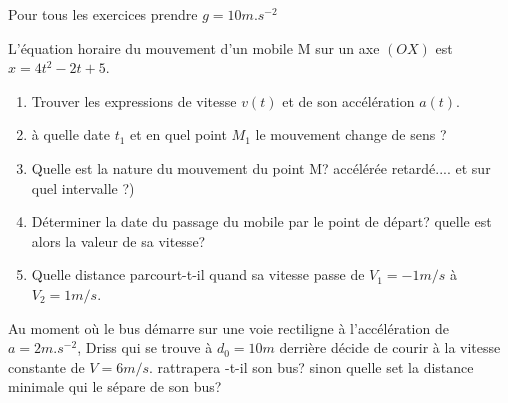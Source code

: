 \documentclass[10pt,a4paper]{article}
\begin{document}
 Pour tous les exercices prendre $g = 10m.s^{-2}$
\begin{tcolorbox}[sabour]
L'équation horaire du mouvement d'un mobile M sur un axe $(OX)$ est $ x=4t^2-2t +5$.
\begin{enumerate}
\item Trouver les expressions de vitesse $v(t)$ et de son accélération $a(t)$.
\item à quelle date $t_1$  et en quel point $M_1$  le mouvement change de sens ?
\item Quelle est la nature du mouvement du point M? accélérée retardé.... et sur quel intervalle ?)
\item Déterminer la date du passage du mobile par le point de départ? quelle est alors la valeur de sa vitesse?
\item Quelle distance parcourt-t-il quand sa vitesse passe de $V_1=-1m/s $ à  
$V_2=1m/s$.
\end{enumerate}

\end{tcolorbox}

\begin{tcolorbox}[sabour,title=EXERCICE 2]
Au moment où le bus démarre sur une voie rectiligne à l'accélération de $a=2m.s^{-2}$, Driss qui se trouve à $d_0= 10m $ derrière décide de courir à la vitesse constante de $V=6m/s$. rattrapera -t-il son bus? sinon quelle set la distance minimale qui le sépare de son bus?

\end{tcolorbox}
\end{document}
